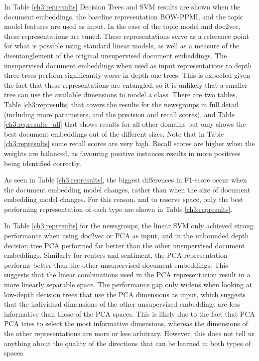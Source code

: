 In Table \ref{ch3:represults} Decision Trees and SVM results are shown when the document embeddings, the baseline representation BOW-PPMI, and the topic model features are used as input. In the case of the topic model and doc2vec, these representations are tuned. These representations serve as a reference point for what is possible using standard linear models, as well as a measure of the disentanglement of the original unsupervised document embeddings. The unsupervised document embeddings when used as input representations to depth three trees perform significantly worse in depth one trees. This is expected given the fact that these representations are entangled, so it is unlikely that a smaller tree can use the available dimensions to model a class. There are two tables, Table \ref{ch3:represults} that covers the results for the newsgroups in full detail (including more parameters, and the precision and recall scores), and Table \ref{ch3:represults_all} that shows results for all other domains but only shows the best document embeddings out of the different sizes.  Note that in Table \ref{ch3:represults} some recall scores are very high.  Recall scores are higher when the weights are balanced, as favouring  positive instances results in more positives being identified correctly. 


As seen in  Table \ref{ch3:represults}, the biggest differences in F1-score occur when the document embedding model changes, rather than when the size of document embedding model changes. For this reason, and to reserve space, only the best performing representation of each type are shown in Table \ref{ch3:represults}.  

In  Table \ref{ch3:represults} for the newsgroups, the linear SVM only achieved strong performance when using   doc2vec or PCA as input, and in the  unbounded depth decision tree PCA performed far better than the other unsupervised document embeddings. Similarly for reuters and sentiment, the PCA representation performs better than the other unsupervised document embeddings. This suggests that the linear combinations used in the PCA representation result in a more linearly separable space. The performance gap only widens when looking at low-depth decision trees that use the PCA dimensions as input, which suggests that the individual dimensions of the other unsupervised embeddings are less informative than those of the PCA spaces. This is likely due to the fact that PCA  PCA tries to select the most informative dimensions, whereas the dimensions of the other representations are more or less arbitrary. However, this does not tell us anything about the quality of the directions that can be learned in both types of spaces. 

